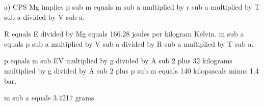a) CPS Mg implies p sub m equals m sub a multiplied by r sub a multiplied by T sub a divided by V sub a.

R equals E divided by Mg equals 166.28 joules per kilogram Kelvin. m sub a equals p sub a multiplied by V sub a divided by R sub a multiplied by T sub a.

p equals m sub EV multiplied by g divided by A sub 2 plus 32 kilograms multiplied by g divided by A sub 2 plus p sub m equals 140 kilopascals minus 1.4 bar.

m sub a equals 3.4217 grams.